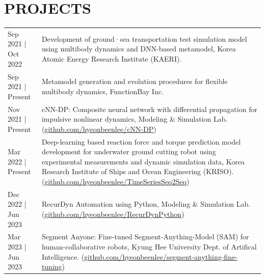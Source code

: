 \documentclass[a4paper,10pt]{extarticle}
\begin{document}
\section*{PROJECTS}
\noindent
{}
\vspace*{-.5cm}
\begin{longtable}{LR}
    {Sep 2021 | Oct 2022} & Development of ground·sea transportation test simulation model using multibody dynamics and DNN-based metamodel, Korea Atomic Energy Research Institute (KAERI).                                                                                                                                                                                   \\
    {Sep 2021 | Present}  & Metamodel generation and evolution procedures for flexible multibody dynamics, FunctionBay Inc.                                                                                                                                                                                                                                                    \\
    {Nov 2021 | Present}  & cNN-DP: Composite neural network with differential propagation for impulsive nonlinear dynamics, Modeling \& Simulation Lab. (\href{https://github.com/hyeonbeenlee/cNN-DP}{github.com/hyeonbeenlee/cNN-DP})                                                                                                                                       \\
    {Mar 2022 | Present}  & Deep-learning based reaction force and torque prediction model development for underwater ground cutting robot using experimental measurements and dynamic simulation data, Korea Research Institute of Ships and Ocean Engineering (KRISO). (\href{https://github.com/hyeonbeenlee/TimeSeriesSeq2Seq}{github.com/hyeonbeenlee/TimeSeriesSeq2Seq}) \\
    {Dec 2022 | Jun 2023} & RecurDyn Automation using Python, Modeling \& Simulation Lab. (\href{https://github.com/hyeonbeenlee/RecurDynPython}{github.com/hyeonbeenlee/RecurDynPython})                                                                                                                                                                                      \\
    {Mar 2023 | Jun 2023} & Segment Anyone: Fine-tuned Segment-Anything-Model (SAM) for human-collaborative robots, Kyung Hee University Dept. of Artifical Intelligence. (\href{https://github.com/hyeonbeenlee/segment-anything-fine-tuning}{github.com/hyeonbeenlee/segment-anything-fine-tuning})                                                                          \\
\end{longtable}
\end{document}

